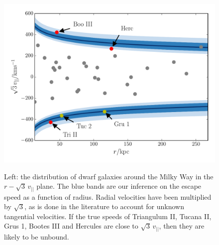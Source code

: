 \documentclass[useAMS,twocolumn,usenatbib]{mn2e}
\def\vlos{{v_{||}}}
\begin{document}
\begin{figure}
\includegraphics[width=\columnwidth]{plots/sats}\\ 
\caption{Left: the distribution of dwarf galaxies around the Milky Way in the $r-\sqrt{3}\,\vlos$ plane. 
The blue bands are our inference on the escape speed as a function of radius. 
Radial velocities have been multiplied by $\sqrt{3}$, as is done in the literature to account for unknown tangential velocities. 
If the true speeds of Triangulum II, Tucana II, Grus 1, Bootes III and Hercules are close to $\sqrt{3}\,\vlos$, then they are likely to be unbound.}
\label{fig:sats}
\end{figure}

\end{document}
